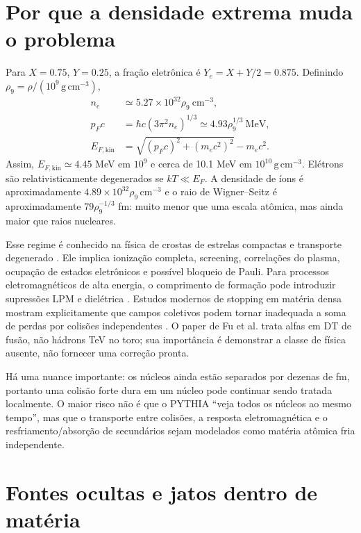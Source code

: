 \documentclass[11pt,a4paper]{article}
\newcommand{\rhoNine}{\rho_9}
\begin{document}
\section{Por que a densidade extrema muda o problema}

Para $X=0.75$, $Y=0.25$, a fração eletrônica é
$Y_e=X+Y/2=0.875$. Definindo $\rhoNine=\rho/(10^9\,\mathrm{g\,cm^{-3}})$,
\begin{align}
n_e &\simeq 5.27\times10^{32}\rhoNine\ \mathrm{cm^{-3}},\\
p_Fc &= \hbar c(3\pi^2n_e)^{1/3}\simeq4.93\rhoNine^{1/3}\ \mathrm{MeV},\\
E_{F,\mathrm{kin}}&=\sqrt{(p_Fc)^2+(m_ec^2)^2}-m_ec^2.
\end{align}
Assim, $E_{F,\mathrm{kin}}\simeq4.45$ MeV em $10^9$ e cerca de 10.1 MeV em
$10^{10}\,\mathrm{g\,cm^{-3}}$. Elétrons são relativisticamente degenerados
se $kT\ll E_F$. A densidade de íons é aproximadamente
$4.89\times10^{32}\rhoNine\,\mathrm{cm^{-3}}$ e o raio de Wigner--Seitz é
aproximadamente $79\rhoNine^{-1/3}$ fm: muito menor que uma escala atômica,
mas ainda maior que raios nucleares.

Esse regime é conhecido na física de crostas de estrelas compactas e
transporte degenerado \cite{Chamel2008,Potekhin2015}. Ele implica ionização
completa, screening, correlações do plasma, ocupação de estados eletrônicos e
possível bloqueio de Pauli. Para processos eletromagnéticos de alta energia,
o comprimento de formação pode introduzir supressões LPM e dielétrica
\cite{Klein1999}. Estudos modernos de stopping em matéria densa mostram
explicitamente que campos coletivos podem tornar inadequada a soma de perdas
por colisões independentes \cite{Fu2023}. O paper de Fu et al. trata alfas em
DT de fusão, não hádrons TeV no toro; sua importância é demonstrar a classe
de física ausente, não fornecer uma correção pronta.

Há uma nuance importante: os núcleos ainda estão separados por dezenas de
fm, portanto uma colisão forte dura em um núcleo pode continuar sendo tratada
localmente. O maior risco não é que o PYTHIA ``veja todos os núcleos ao mesmo
tempo'', mas que o transporte entre colisões, a resposta eletromagnética e o
resfriamento/absorção de secundários sejam modelados como matéria atômica
fria independente.

\section{Fontes ocultas e jatos dentro de matéria}
\end{document}
